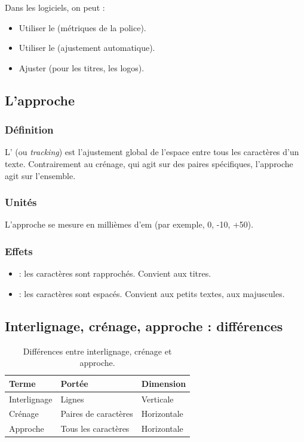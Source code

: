 Dans les logiciels, on peut :

\begin{itemize}
    \item Utiliser le  (métriques de la police).
    \item Utiliser le  (ajustement automatique).
    \item Ajuster  (pour les titres, les logos).
\end{itemize}

\subsection{L'approche}

\subsubsection{Définition}

L' (ou \emph{tracking}) est l'ajustement global de l'espace entre tous les caractères d'un texte. Contrairement au crénage, qui agit sur des paires spécifiques, l'approche agit sur l'ensemble.

\subsubsection{Unités}

L'approche se mesure en millièmes d'em (par exemple, 0, -10, +50).

\subsubsection{Effets}

\begin{itemize}
    \item {} : les caractères sont rapprochés. Convient aux titres.
    \item {} : les caractères sont espacés. Convient aux petits textes, aux majuscules.
\end{itemize}

\subsection{Interlignage, crénage, approche : différences}

\begin{table}[h!]
\centering
\begin{tabular}{@{}lll@{}}
\toprule
\textbf{Terme} & \textbf{Portée} & \textbf{Dimension} \\
\midrule
Interlignage & Lignes & Verticale \\
Crénage & Paires de caractères & Horizontale \\
Approche & Tous les caractères & Horizontale \\
\bottomrule
\end{tabular}
\caption{Différences entre interlignage, crénage et approche.}
\end{table}

